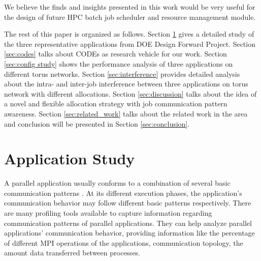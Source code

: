 \documentclass[conference]{IEEEtran}
\begin{document}
We believe the finds and insights presented in this work would be very useful for the design of future HPC batch job scheduler and resource management module.



The rest of this paper is organized as follows. Section \ref{sec:application study} gives a detailed study of the three representative applications from DOE Design Forward Project. Section \ref{sec:codes} talks about CODEs as research vehicle for our work. Section \ref{sec:config study} shows the performance analysis of three applications on different torus networks. Section \ref{sec:interference} provides detailed analysis about the intra- and inter-job interference between three applications on torus network with different allocations. Section \ref{sec:discussion} talks about the idea of a novel and flexible allocation strategy with job communication pattern awareness. Section \ref{sec:related_work} talks about the related work in the area and conclusion will be presented in Section \ref{sec:conclusion}. 




\section{Application Study}
\label{sec:application study}


A parallel application usually conforms to a combination of several basic communication patterns \cite{roth}. At its different execution phases, the application's communication behavior may follow different basic patterns respectively. There are many profiling tools \cite{tau}\cite{mpip}\cite{scala}\cite{sst}\cite{oxbow} available to capture information regarding communication patterns of parallel applications. They can help analyze parallel applications' communication behavior, providing information like the percentage of different MPI operations of the applications, communication topology, the amount data transferred between processes.
\end{document}
